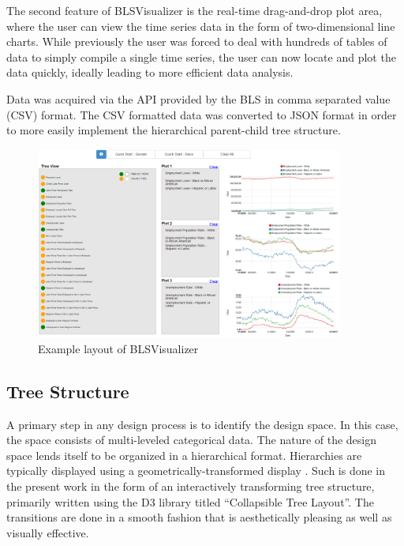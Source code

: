 \documentclass[11pt,letterpaper]{article}
\begin{document}
The second feature of BLSVisualizer is the real-time drag-and-drop plot area, where the user can view the time series data in the form of two-dimensional line charts. While previously the user was forced to deal with hundreds of tables of data to simply compile a single time series, the user can now locate and plot the data quickly, ideally leading to more efficient data analysis.

Data was acquired via the API provided by the BLS in comma separated value (CSV) format. The CSV formatted data was converted to JSON format in order to more easily implement the hierarchical parent-child tree structure.

\begin{figure}[t]
\centering
    \includegraphics[width=0.9\textwidth]{figures/BLSVisualizer.png}
    \caption{Example layout of BLSVisualizer }
    \label{BLSVLayout}
\end{figure}


\subsection{Tree Structure}

A primary step in any design process is to identify the design space. In this case, the space consists of multi-leveled categorical data. The nature of the design space lends itself to be organized in a hierarchical format. Hierarchies are typically displayed using a geometrically-transformed display \cite{keim2002information}. Such is done in the present work in the form of an interactively transforming tree structure, primarily written using the D3 library titled ``Collapsible Tree Layout''. The transitions are done in a smooth fashion that is aesthetically pleasing as well as visually effective.
\end{document}
